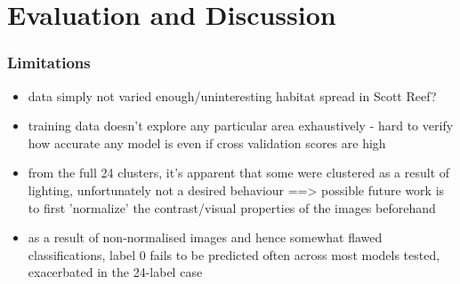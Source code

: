 \chapter{Evaluation and Discussion} \label{chap:evaluation}

\subsection{Limitations}

\begin{itemize}
    \item data simply not varied enough/uninteresting habitat spread in Scott Reef?
    \item training data doesn't explore any particular area exhaustively - hard to verify how accurate any model is even if cross validation scores are high
    \item from the full 24 clusters, it's apparent that some were clustered as a result of lighting, unfortunately not a desired behaviour ==> possible future work is to first 'normalize' the contrast/visual properties of the images beforehand 
    \item as a result of non-normalised images and hence somewhat flawed classifications, label 0 fails to be predicted often across most models tested, exacerbated in the 24-label case
\end{itemize}
